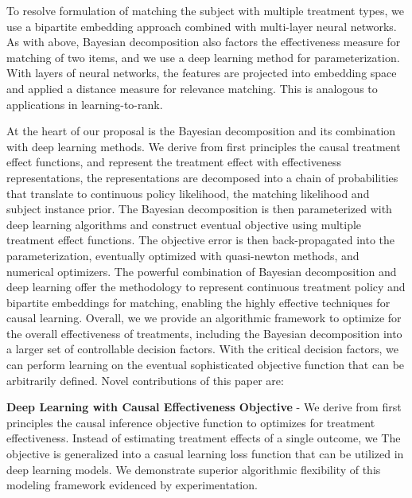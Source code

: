 \documentclass{article}
\begin{document}
To resolve formulation of matching the subject with multiple treatment types, we use a bipartite embedding approach combined with multi-layer neural networks. As with above, Bayesian decomposition also factors the effectiveness measure for matching of two items, and we use a deep learning method for parameterization. With layers of neural networks, the features are projected into embedding space and applied a distance measure for relevance matching. This is analogous to applications in learning-to-rank. 

At the heart of our proposal is the Bayesian decomposition and its combination with deep learning methods. We derive from first principles the causal treatment effect functions, and represent the treatment effect with effectiveness representations, the representations are decomposed into a chain of probabilities that translate to continuous policy likelihood, the matching likelihood and subject instance prior. The Bayesian decomposition is then parameterized with deep learning algorithms and construct eventual objective using multiple treatment effect functions. The objective error is then back-propagated into the parameterization, eventually optimized with quasi-newton methods, and numerical optimizers. The powerful combination of Bayesian decomposition and deep learning offer the methodology to represent continuous treatment policy and bipartite embeddings for matching, enabling the highly effective techniques for causal learning. Overall, we we provide an algorithmic framework to optimize for the overall effectiveness of treatments, including the Bayesian decomposition into a larger set of controllable decision factors. With the critical decision factors, we can perform learning on the eventual sophisticated objective function that can be arbitrarily defined. Novel contributions of this paper are: 



\textbf{Deep Learning with Causal Effectiveness Objective} - We derive from first principles the causal inference objective function to optimizes for treatment effectiveness. Instead of estimating treatment effects of a single outcome, we The objective is generalized into a casual learning loss function that can be utilized in deep learning models. We demonstrate superior algorithmic flexibility of this modeling framework evidenced by experimentation. 
\end{document}

